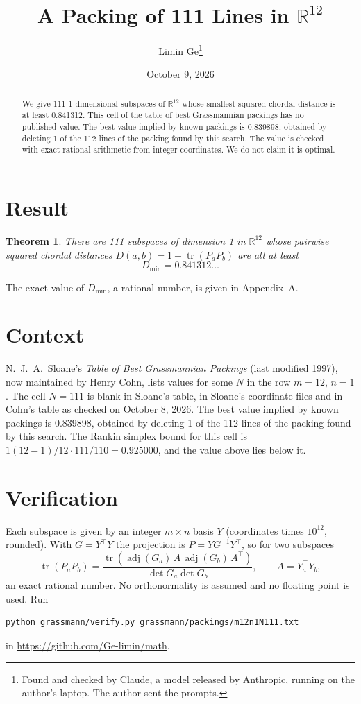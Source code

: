 \documentclass[11pt,a4paper]{article}
\title{A Packing of 111 Lines in $\mathbb{R}^{12}$}
\author{Limin Ge\thanks{Found and checked by Claude, a model released by Anthropic, running on the author's laptop. The author sent the prompts.}}
\date{October 9, 2026}
\newtheorem*{theorem}{Theorem}
\begin{document}
\maketitle
\begin{abstract}
We give 111 1-dimensional subspaces of $\mathbb{R}^{12}$ whose smallest squared chordal distance is at least 0.841312. This cell of the table of best Grassmannian packings has no published value. The best value implied by known packings is 0.839898, obtained by deleting 1 of the 112 lines of the packing found by this search. The value is checked with exact rational arithmetic from integer coordinates. We do not claim it is optimal.
\end{abstract}

\section{Result}
\begin{theorem}
There are 111 subspaces of dimension 1 in $\mathbb{R}^{12}$ whose pairwise squared chordal distances $D(a,b) = 1 - \operatorname{tr}(P_aP_b)$ are all at least
\[ D_{\min} = 0.841312\ldots \]
\end{theorem}
The exact value of $D_{\min}$, a rational number, is given in Appendix~A.


\section{Context}
N.~J.~A.~Sloane's \emph{Table of Best Grassmannian Packings} (last modified 1997), now maintained by Henry Cohn, lists values for some $N$ in the row $m=12$, $n=1$. The cell $N=111$ is blank in Sloane's table, in Sloane's coordinate files and in Cohn's table as checked on October 8, 2026. The best value implied by known packings is 0.839898, obtained by deleting 1 of the 112 lines of the packing found by this search. The Rankin simplex bound for this cell is $1(12-1)/12\cdot 111/110 = 0.925000$, and the value above lies below it.


\section{Verification}
Each subspace is given by an integer $m\times n$ basis $Y$ (coordinates times $10^{12}$, rounded). With $G=Y^\top Y$ the projection is $P=YG^{-1}Y^\top$, so for two subspaces
\[ \operatorname{tr}(P_aP_b)=\frac{\operatorname{tr}(\operatorname{adj}(G_a)\,A\,\operatorname{adj}(G_b)\,A^\top)}{\det G_a\det G_b},\qquad A=Y_a^\top Y_b, \]
an exact rational number. No orthonormality is assumed and no floating point is used. Run
\begin{verbatim}
python grassmann/verify.py grassmann/packings/m12n1N111.txt
\end{verbatim}
in \url{https://github.com/Ge-limin/math}.
\end{document}
